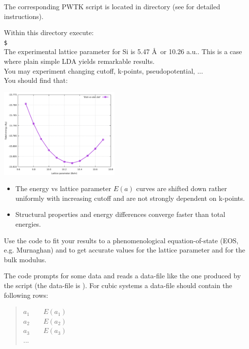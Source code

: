 \documentclass[landscape]{foils}
\def\indent{\hspace*{1cm}}
\def\prompt{\texttt{\$~}}
\begin{document}

The corresponding PWTK script is located in
 directory (see  for
detailed instructions).

\parbox{0.5\textwidth}{
  Within this directory execute:\\[0.5em]
  \indent\prompt{}\\[0.5em]

  The experimental lattice parameter for Si is 5.47 \AA\ or 10.26
  a.u..  This is a case where plain simple LDA yields remarkable results.\\
  You may experiment changing cutoff, k-points, pseudopotential,
  ...\\[0.5em]
  You should find that:
} \parbox{0.5\textwidth}{
  \begin{flushright}
    \includegraphics[width=0.45\textwidth]{figs/etot-vs-alat.pdf}
  \end{flushright}
}
\begin{itemize}
\item The energy vs lattice parameter $E(a)$ curves are shifted down rather 
  uniformly with increasing cutoff and are not strongly dependent on k-points.
\item Structural properties and energy differences converge faster than total
  energies.
\end{itemize}

%
Use the code  to fit your results to a
phenomenological equation-of-state (EOS, e.g. Murnaghan) and to get
accurate values for the lattice parameter and for the bulk modulus.

The  code prompts for some data and reads a data-file like
the one produced by the  script (the data-file is
). For cubic systems a data-file should contain
the following rows:
\begin{quote}
$a_1\qquad E(a_1)$\\
$a_2\qquad E(a_2)$\\
$a_3\qquad E(a_3)$\\
...\\  
\end{quote}
\end{document}
